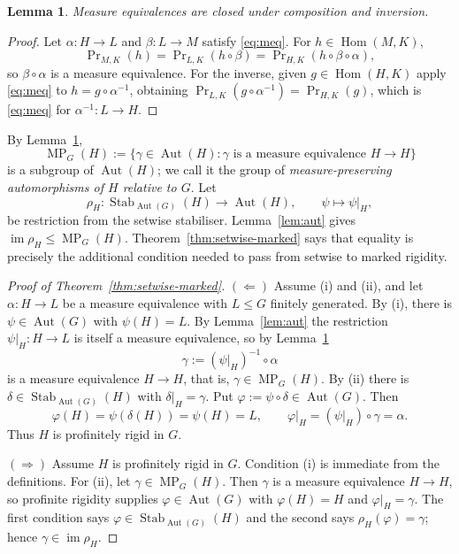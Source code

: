 \documentclass[11pt]{amsart}
\theoremstyle{plain}
\newtheorem{lemma}[theorem]{Lemma}
\theoremstyle{definition}
\newcommand{\Hom}{\operatorname{Hom}}
\newcommand{\Aut}{\operatorname{Aut}}
\newcommand{\Stab}{\operatorname{Stab}}
\newcommand{\MP}{\operatorname{MP}}
\begin{document}
\begin{lemma}\label{lem:groupoid}
Measure equivalences are closed under composition and inversion.
\end{lemma}

\begin{proof}
Let $\alpha\colon H\to L$ and $\beta\colon L\to M$ satisfy \eqref{eq:meq}.  For
$h\in\Hom(M,K)$,
\[
  \Pr\nolimits_{M,K}(h)=\Pr\nolimits_{L,K}(h\circ\beta)
   =\Pr\nolimits_{H,K}(h\circ\beta\circ\alpha),
\]
so $\beta\circ\alpha$ is a measure equivalence.  For the inverse, given
$g\in\Hom(H,K)$ apply \eqref{eq:meq} to $h=g\circ\alpha^{-1}$, obtaining
$\Pr_{L,K}(g\circ\alpha^{-1})=\Pr_{H,K}(g)$, which is \eqref{eq:meq} for
$\alpha^{-1}\colon L\to H$.
\end{proof}

By Lemma~\ref{lem:groupoid},
\[
  \MP_G(H):=\{\gamma\in\Aut(H):\gamma\text{ is a measure equivalence }H\to H\}
\]
is a subgroup of $\Aut(H)$; we call it the group of \emph{measure-preserving
automorphisms of $H$ relative to $G$}. Let
\[
  \rho_H\colon\Stab_{\Aut(G)}(H)\longrightarrow\Aut(H),
  \qquad \psi\longmapsto\psi|_H,
\]
be restriction from the setwise stabiliser. Lemma~\ref{lem:aut} gives
$\operatorname{im}\rho_H\le\MP_G(H)$. Theorem~\ref{thm:setwise-marked} says
that equality is precisely the additional condition needed to pass from
setwise to marked rigidity.

\begin{proof}[Proof of Theorem~\ref{thm:setwise-marked}]
$(\Leftarrow)$  Assume (i) and (ii), and let $\alpha\colon H\to L$ be a measure
equivalence with $L\le G$ finitely generated.  By (i), there is
$\psi\in\Aut(G)$ with $\psi(H)=L$.  By Lemma~\ref{lem:aut} the restriction
$\psi|_H\colon H\to L$ is itself a measure equivalence, so by
Lemma~\ref{lem:groupoid}
\[
  \gamma:=(\psi|_H)^{-1}\circ\alpha
\]
is a measure equivalence $H\to H$, that is, $\gamma\in\MP_G(H)$.  By (ii) there
is $\delta\in\Stab_{\Aut(G)}(H)$ with $\delta|_H=\gamma$.  Put
$\varphi:=\psi\circ\delta\in\Aut(G)$.  Then
\[
  \varphi(H)=\psi(\delta(H))=\psi(H)=L,
  \qquad
  \varphi|_H=(\psi|_H)\circ\gamma=\alpha .
\]
Thus $H$ is profinitely rigid in $G$.

$(\Rightarrow)$  Assume $H$ is profinitely rigid in $G$.  Condition (i) is
immediate from the definitions.  For (ii), let $\gamma\in\MP_G(H)$.  Then
$\gamma$ is a measure equivalence $H\to H$, so profinite rigidity supplies
$\varphi\in\Aut(G)$ with $\varphi(H)=H$ and $\varphi|_H=\gamma$.  The first
condition says $\varphi\in\Stab_{\Aut(G)}(H)$ and the second says
$\rho_H(\varphi)=\gamma$; hence $\gamma\in\operatorname{im}\rho_H$.
\end{proof}
\end{document}
